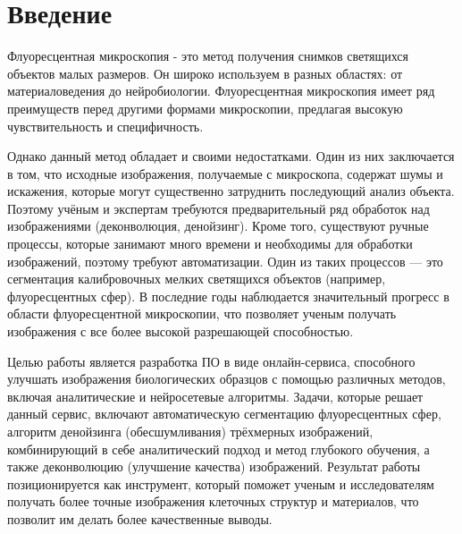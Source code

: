 \chapter*{Введение} %
\par Флуоресцентная микроскопия - это метод получения снимков светящихся объектов малых размеров. Он широко используем в разных областях: от материаловедения до нейробиологии. Флуоресцентная микроскопия имеет ряд преимуществ перед другими формами микроскопии, предлагая высокую чувствительность и специфичность. \cite{ROST2017627}
\par Однако данный метод обладает и своими недостатками. Один из них заключается в том, что исходные изображения, получаемые с микроскопа, содержат шумы и искажения, которые могут существенно затруднить последующий анализ объекта. Поэтому учёным и экспертам требуются предварительный ряд обработок над изображениями (деконволюция, денойзинг). Кроме того, существуют ручные процессы, которые занимают много времени и необходимы для обработки изображений, поэтому требуют автоматизации. Один из таких процессов — это сегментация калибровочных мелких светящихся объектов (например, флуоресцентных сфер). В последние годы наблюдается значительный прогресс в области флуоресцентной микроскопии, что позволяет ученым получать изображения с все более высокой разрешающей способностью.  
\par Целью работы является разработка ПО в виде онлайн-сервиса, способного улучшать изображения биологических образцов с помощью различных методов, включая аналитические и нейросетевые алгоритмы. Задачи, которые решает данный сервис, включают автоматическую сегментацию флуоресцентных сфер, алгоритм денойзинга (обесшумливания) трёхмерных изображений, комбинирующий в себе аналитический подход и метод глубокого обучения, а также деконволюцию (улучшение качества) изображений. Результат работы позиционируется как инструмент, который поможет ученым и исследователям получать более точные изображения клеточных структур и материалов, что позволит им делать более качественные выводы.



